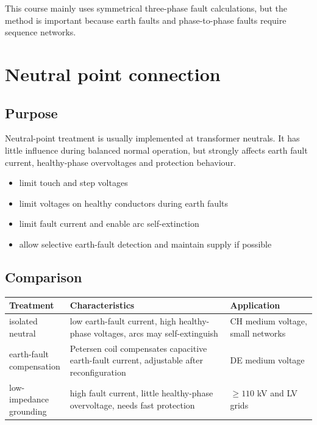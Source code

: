 \documentclass[9pt, landscape, a4paper]{article}
\begin{document}
\begin{multicols*}{3}
This course mainly uses symmetrical three-phase fault calculations, but the
method is important because earth faults and phase-to-phase faults require
sequence networks.

\section{Neutral point connection}
\subsection{Purpose}
Neutral-point treatment is usually implemented at transformer neutrals. It has
little influence during balanced normal operation, but strongly affects earth
fault current, healthy-phase overvoltages and protection behaviour.

\begin{itemize}
  \item limit touch and step voltages
  \item limit voltages on healthy conductors during earth faults
  \item limit fault current and enable arc self-extinction
  \item allow selective earth-fault detection and maintain supply if possible
\end{itemize}

\subsection{Comparison}
\begin{tabularx}{\columnwidth}{@{}lXX@{}}
  \toprule
  \textbf{Treatment} & \textbf{Characteristics} & \textbf{Application}\\
  \midrule
  \makecell[l]{isolated\\neutral}& low earth-fault current, high healthy-phase voltages, arcs may self-extinguish & CH medium voltage, small networks\\
  \makecell[l]{earth-fault\\compensation} & Petersen coil compensates capacitive earth-fault current, adjustable after reconfiguration & DE medium voltage\\
  \makecell[l]{low-impedance\\grounding} & high fault current, little healthy-phase overvoltage, needs fast protection & $\geq110$ kV and LV grids\\
  \bottomrule
\end{tabularx}


\end{multicols*}
\end{document}
